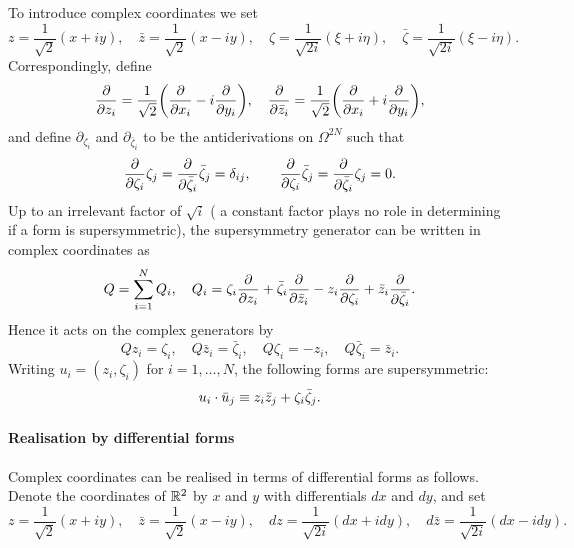 \documentclass[11pt,a4paper]{article}
\begin{document}
To introduce complex coordinates we set
\begin{equation}
  z = \frac{1}{\sqrt{2}} ( x + i y), \quad \bar z = \frac{1}{\sqrt{2}} (x - i y), \quad
  \zeta = \frac{1}{\sqrt{2 i}} (\xi + i\eta), \quad \bar\zeta =
  \frac{1}{\sqrt{2i}} (\xi-i\eta).
\end{equation}
Correspondingly, define
\begin{equation}
  \ddp{}{z_i} = \frac{1}{\sqrt{2}} \pa{\ddp{}{x_i} -i \ddp{}{y_i}}, \quad
  \ddp{}{\bar z_i} = \frac{1}{\sqrt{2}} \pa{\ddp{}{x_i} +i \ddp{}{y_i}},
\end{equation}
and define $\partial_{\zeta_i}$ and $\partial_{\bar\zeta_i}$ to be the antiderivations on $\Omega^{2N}$ such that
\begin{equation}
  \frac{\partial }{\partial \zeta_i} \zeta_j
  =
  \frac{\partial }{\partial \bar\zeta_i} \bar\zeta_j = \delta_{ij}, \qquad
  \frac{\partial }{\partial \zeta_i} \bar\zeta_j
  =
  \frac{\partial }{\partial \bar\zeta_i} \zeta_j = 0.
\end{equation}
Up to an irrelevant factor of $\sqrt{i}$ (
a constant factor plays no role in  determining if a form is supersymmetric),
the supersymmetry generator can be written in complex coordinates as
\begin{equation} \label{e:Qdef}
  Q = \sum_{i=1}^N Q_i, \quad Q_i = \zeta_i \frac{\partial }{\partial z_i} + \bar\zeta_i \frac{\partial }{\partial \bar z_i} - z_i \frac{\partial }{\partial \zeta_i} + \bar z_i \frac{\partial }{\partial \bar\zeta_i}.
\end{equation}
Hence it acts on the complex generators by
\begin{equation}
  Qz_i = \zeta_i, \quad Q\bar z_i = \bar \zeta_i, \quad Q\zeta_i = -z_i, \quad Q\bar\zeta_i = \bar z_i.
\end{equation}
Writing $u_{i}=(z_{i},\zeta_{i})$ for $i=1,\dots, N$, the following
forms are supersymmetric:
\begin{equation} 
  u_i \cdot \bar u_j \equiv z_i \bar z_j + \zeta_i \bar \zeta_j.
\end{equation}


\paragraph{Realisation by differential forms}

Complex coordinates can be realised in terms of differential forms as
follows.  Denote the coordinates of $\mathbb{R}^{2}$ by $x$ and $y$ with
differentials $dx$ and $dy$, and set
\begin{equation}
  z = \frac{1}{\sqrt{2}} ( x + i y), \quad \bar z = \frac{1}{\sqrt{2}}
  (x - i y), \quad dz = \frac{1}{\sqrt{2i}} (dx + i dy), \quad
  d\bar z = \frac{1}{\sqrt{2i}}( dx - i dy).
\end{equation}
\end{document}
